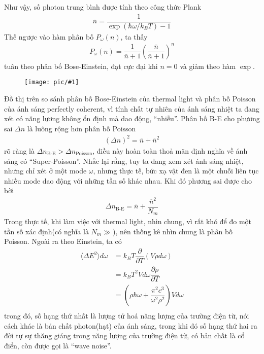 \documentclass{report}
\newcommand{\image}[1]{
\begin{figure}[H]
	\centering
	\texttt{[image: pic/\#1]}
	\label{#1}
\end{figure}
}
\newcommand{\q}[1]{``#1''}
\newcommand{\mean}[1]{\langle{#1}\rangle}
\newcommand{\f}[2]{\dfrac{#1}{#2}}
\begin{document}
Như vậy, số photon trung bình được tính theo công thức Plank
\begin{gather}
	\overline{n} = \f{1}{\exp(\hbar \omega/k_{B}T) - 1}
\end{gather}
Thế ngược vào hàm phân bố $P_{\omega}(n)$, ta thấy
\begin{gather}
	P_{\omega}(n) = \f{1}{\overline{n} + 1} \left(\f{\overline{n}}{\overline{n} + 1}\right)^{n}
\end{gather}
tuân theo phân bố Bose-Einstein, đạt cực đại khi $n =0$ và giảm theo hàm $\exp$.
\image{BosEin.png}
Đồ thị trên so sánh phân bố Bose-Einstein của thermal light và phân bố Poisson của ánh sáng perfectly coherent, vì tính chất tự nhiên của ánh sáng nhiệt ta đang xét có năng lương không ổn định mà dao động, \q{nhiễu}. Phân bố B-E cho phương sai $\Delta n$ là luông rộng hơn phân bố Poisson
\begin{gather}
	(\Delta n)^{2} = \overline{n} + \overline{n}^{2} 
\end{gather} 
rõ ràng là $\Delta n_{\text{B-E}} > \Delta n_{\text{Poisson}}$, điều này hoàn toàn thoả mãn định nghĩa về ánh sáng có \q{Super-Poisson}. Nhắc lại rằng, tuy ta đang xem xét ánh sáng nhiệt, nhưng chỉ xét ở một mode $\omega$, nhưng thực tế, bức xạ vật đen là một chuỗi liên tục nhiều mode dao động với những tần số khác nhau. Khi đó phương sai được cho bời
\begin{gather}
	\Delta n_{\text{B-E}} = \overline{n} + \f{\overline{n}^{2}}{N_{m}}
\end{gather}
Trong thực tế, khi làm việc với thermal light, nhìn chung, vì rất khó để đo một tần số xác định(có nghĩa là $N_{m} \gg$), nên thống kê nhìn chung là phân bố Poisson. Ngoài ra theo Einstein, ta có
\begin{equation}
	\begin{aligned}
		\mean{\Delta E^{2}} d\omega 
		&= k_{B} T \f{\partial}{\partial T} (V \rho d\omega)\\	
		&= k_{B} T^{2} V d\omega \f{\partial \rho}{\partial T} \\	
		&= \left( \rho \hbar \omega + \f{ \pi^{2} c^{3} }{\omega^{2} \rho^{2} } \right) V d\omega \\
	\end{aligned}	
\end{equation}
trong đó, số hạng thứ nhất là lượng tử hoá năng lượng của trường điện từ, nói cách khác là bản chất photon(hạt) của ánh sáng, trong khi đó số hạng thứ hai ra đời tự sự thăng giáng trong năng lượng của trường điện từ, có bản chất là cổ điển, còn được gọi là \q{wave noise}.
\end{document}
